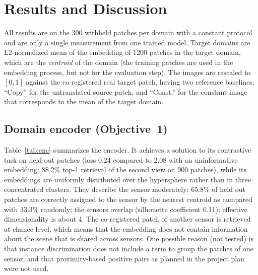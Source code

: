 \documentclass[conference]{IEEEtran}
\begin{document}
\section{Results and Discussion}
\label{sec:results}
All results are on the 300 withheld patches per domain with a constant protocol and are only a single measurement from one trained model. Target domains are L2-normalized mean of the embedding of 1200 patches in the target domain, which are the \emph{centroid} of the domain (the training patches are used in the embedding process, but not for the evaluation step). The images are rescaled to $[0,1]$ against the co-registered real target patch, having two reference baselines: ``Copy'' for the untranslated source patch, and ``Const.'' for the constant image that corresponds to the mean of the target domain.

\subsection{Domain encoder (Objective~1)}
Table~\ref{tab:enc} summarizes the encoder. It achieves a solution to its contrastive task on held-out patches (loss 0.24 compared to 2.08 with an uninformative embedding; 88.2\% top-1 retrieval of the second view on 900 patches), while its embeddings are uniformly distributed over the hypersphere rather than in three concentrated clusters. They describe the sensor moderately: 65.8\% of held out patches are correctly assigned to the sensor by the nearest centroid as compared with 33.3\% randomly; the sensors overlap (silhouette coefficient 0.11); effective dimensionality is about 4. The co-registered patch of another sensor is retrieved at chance level, which means that the embedding does not contain information about the scene that is shared across sensors. One possible reason (not tested) is that instance discrimination does not include a term to group the patches of one sensor, and that proximity-based positive pairs as planned in the project plan were not used.
\end{document}

